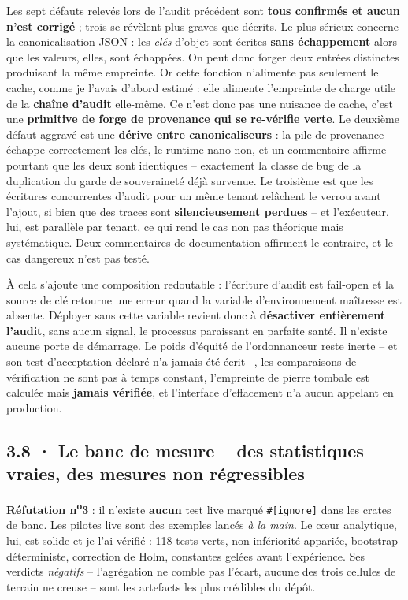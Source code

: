 \documentclass[10pt]{article}
\newcommand{\code}[1]{\texttt{\small #1}}
\begin{document}
Les sept défauts relevés lors de l'audit précédent sont \textbf{tous confirmés et aucun n'est corrigé} ;
trois se révèlent plus graves que décrits. Le plus sérieux concerne la canonicalisation JSON : les
\emph{clés} d'objet sont écrites \textbf{sans échappement} alors que les valeurs, elles, sont échappées.
On peut donc forger deux entrées distinctes produisant la même empreinte. Or cette fonction n'alimente
pas seulement le cache, comme je l'avais d'abord estimé : elle alimente l'empreinte de charge utile de
la \textbf{chaîne d'audit} elle-même. Ce n'est donc pas une nuisance de cache, c'est une
\textbf{primitive de forge de provenance qui se re-vérifie verte}. Le deuxième défaut aggravé est une
\textbf{dérive entre canonicaliseurs} : la pile de provenance échappe correctement les clés, le runtime
nano non, et un commentaire affirme pourtant que les deux sont identiques -- exactement la classe de bug
de la duplication du garde de souveraineté déjà survenue. Le troisième est que les écritures
concurrentes d'audit pour un même tenant relâchent le verrou avant l'ajout, si bien que des traces sont
\textbf{silencieusement perdues} -- et l'exécuteur, lui, est parallèle par tenant, ce qui rend le cas
non pas théorique mais systématique. Deux commentaires de documentation affirment le contraire, et le
cas dangereux n'est pas testé.

À cela s'ajoute une composition redoutable : l'écriture d'audit est fail-open et la source de clé
retourne une erreur quand la variable d'environnement maîtresse est absente. Déployer sans cette
variable revient donc à \textbf{désactiver entièrement l'audit}, sans aucun signal, le processus
paraissant en parfaite santé. Il n'existe aucune porte de démarrage. Le poids d'équité de
l'ordonnanceur reste inerte -- et son test d'acceptation déclaré n'a jamais été écrit --, les
comparaisons de vérification ne sont pas à temps constant, l'empreinte de pierre tombale est calculée
mais \textbf{jamais vérifiée}, et l'interface d'effacement n'a aucun appelant en production.

\subsection{3.8 · Le banc de mesure -- des statistiques vraies, des mesures non régressibles}

\textbf{Réfutation n\textsuperscript{o}3} : il n'existe \textbf{aucun} test live marqué
\code{\#[ignore]} dans les crates de banc. Les pilotes live sont des exemples lancés \emph{à la main}.
Le c\oe{}ur analytique, lui, est solide et je l'ai vérifié : 118 tests verts, non-infériorité appariée,
bootstrap déterministe, correction de Holm, constantes gelées avant l'expérience. Ses verdicts
\emph{négatifs} -- l'agrégation ne comble pas l'écart, aucune des trois cellules de terrain ne creuse --
sont les artefacts les plus crédibles du dépôt.
\end{document}
